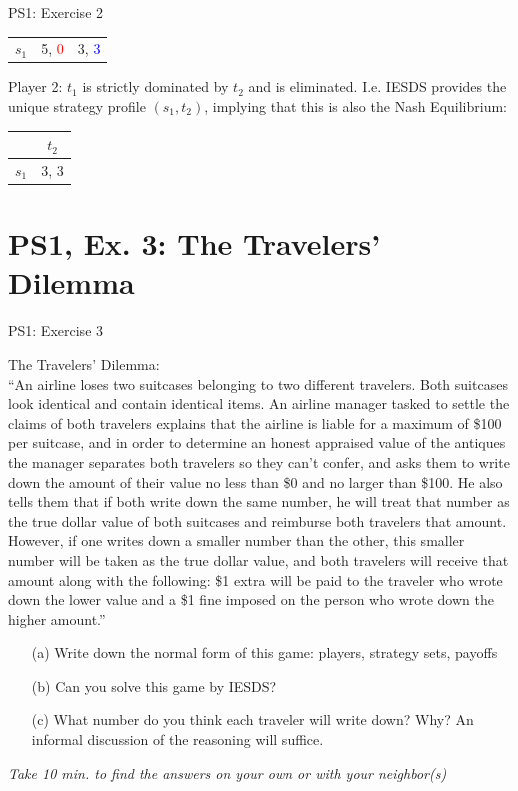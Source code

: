 \begin{frame}{PS1: Exercise 2}
\begin{multicols}{2}
\begin{table}
\begin{tabular}{c|c|c}
    \midrule
    $s_1$ & 5, \textcolor{red}{0}  & 3, \textcolor{blue}{3}
  \end{tabular}
\end{table}
Player 2: $t_1$ is strictly dominated by $t_2$ and is eliminated. I.e. IESDS provides the unique strategy profile $(s_1,t_2)$, implying that this is also the Nash Equilibrium:
\begin{table}
  \begin{tabular}{c|c}
          & $t_2$ \\
    \midrule
    $s_1$ & 3, 3
  \end{tabular}
\end{table}
\vfill\null
\end{multicols}
\end{frame}


\section{PS1, Ex. 3: The Travelers' Dilemma}

\begin{frame}{PS1: Exercise 3}
\begin{multicols}{2}
  The Travelers' Dilemma:\\\smallskip
  “An airline loses two suitcases belonging to two different travelers. Both suitcases look identical and contain identical items. An airline manager tasked to settle the claims of both travelers explains that the airline is liable for a maximum of \$100 per suitcase, and in order to determine an honest appraised value of the antiques the manager separates both travelers so they can’t confer, and asks them to write down the amount of their value no less than \$0 and no larger than \$100. He also tells them that if both write down the same number, he will treat that number as the true dollar value of both suitcases and reimburse both travelers that amount.
\vfill\null \columnbreak
However, if one writes down a smaller number than the other, this smaller number will be taken as the true dollar value, and both travelers will receive that amount along with the following: \$1 extra will be paid to the traveler who wrote down the lower value and a \$1 fine imposed on the person who wrote down the higher amount.”
\begin{itemize}
  \item[(a)] Write down the normal form of this game: players, strategy sets, payoffs
\item[(b)] Can you solve this game by IESDS?
\item[(c)] What number do you think each traveler will write down? Why? An informal
discussion of the reasoning will suffice.
\end{itemize}
\textit{Take 10 min. to find the answers on your own or with your neighbor(s)}
\vfill\null
\end{multicols}
\end{frame}

